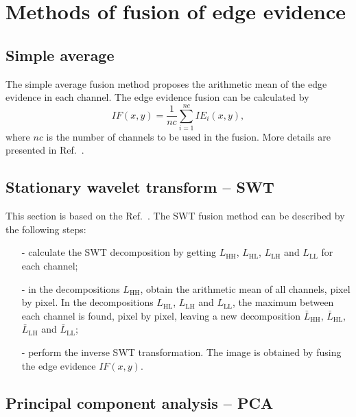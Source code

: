 \documentclass[conference]{IEEEtran}
\begin{document}
\section{Methods of fusion of edge evidence}\label{sec_07}

\subsection{Simple average}
The simple average fusion method proposes the arithmetic mean of the edge evidence in each channel. 
The edge evidence fusion can be calculated by
\begin{equation}
	IF(x,y)=\frac{1}{nc}\sum_{i=1}^{nc}IE_i(x,y),
\end{equation}
where $nc$ is the number of channels to be used in the fusion. 
More details are presented in Ref.~\cite{mit}.

\subsection{Stationary wavelet transform -- SWT} 

This section is based on the Ref.~\cite{n_r}. 
The SWT fusion method can be described by the following steps:
\begin{itemize}
\item[-] calculate the SWT decomposition by getting $L_\text{HH}$, $L_\text{HL}$, $L_\text{LH}$ and $L_\text{LL}$ for each channel; %
\item[-] in the decompositions $L_\text{HH}$, obtain the arithmetic mean of all channels, pixel by pixel. In the decompositions $L_\text{HL}$, $L_\text{LH}$ and $L_\text{LL}$, the maximum between each channel is found, pixel by pixel, leaving a new decomposition $\bar{L}_\text{HH}$, $\bar{L}_\text{HL}$, $\bar{L}_\text{LH}$ and $\bar{L}_\text{LL}$;
\item[-] perform the inverse SWT transformation. The image is obtained by fusing the edge evidence $IF(x,y)$.  
\end{itemize}

\subsection{Principal component analysis -- PCA}
\end{document}
